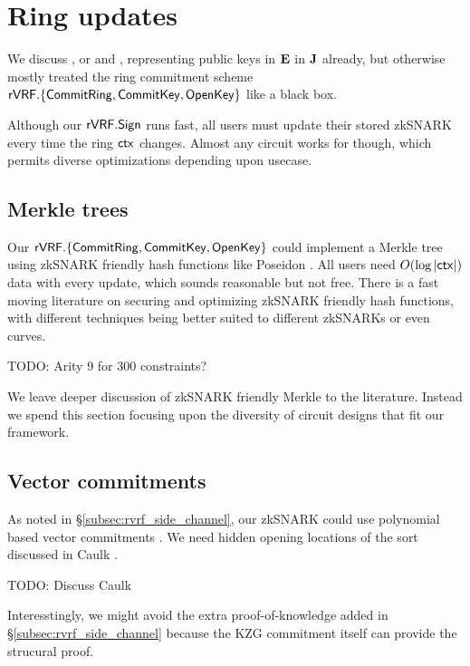 \section{Ring updates}
\label{sec:ring_updates}

We discuss \pifast, or \pisk and \pipk, representing public keys
 in ${\mathbf{E}}$ in ${\mathbf{J}}$ already,
but otherwise mostly treated the ring commitment scheme
${\mathsf{rVRF}}.\{ {\mathsf{CommitRing}}, {\mathsf{CommitKey}}, {\mathsf{OpenKey}} \}$ like a black box.

Although our ${\mathsf{rVRF}}.{\mathsf{Sign}}$ runs fast, all users must update their
stored zkSNARK \pipk every time the ring $\mathsf{ctx}$ changes.
Almost any circuit works for \pipk though,
 which permits diverse optimizations depending upon usecase.


\subsection{Merkle trees} %

Our ${\mathsf{rVRF}}.\{ {\mathsf{CommitRing}}, {\mathsf{CommitKey}}, {\mathsf{OpenKey}} \}$ could implement a
Merkle tree using zkSNARK friendly hash functions like Poseidon \cite{poseidon}.
%
All users need $O(\log |\mathsf{ctx}|)$ data with every update, which sounds
reasonable but not free.  There is a fast moving literature on securing
and optimizing zkSNARK friendly hash functions, with different techniques
being better suited to different zkSNARKs or even curves.

TODO: Arity 9 for 300 constraints?   %

We leave deeper discussion of zkSNARK friendly Merkle to the literature.
Instead we spend this section focusing upon the diversity of circuit
designs that fit our framework.


\subsection{Vector commitments}

As noted in \S\ref{subsec:rvrf_side_channel}, our zkSNARK \pipk could use
polynomial based vector commitments \cite{KZG}. %
We need hidden opening locations of the sort discussed in Caulk \cite{Caulk}.

TODO: Discuss Caulk

Interesstingly, we might avoid the extra proof-of-knowledge added
in \S\ref{subsec:rvrf_side_channel} because the KZG commitment itself
can provide the strucural proof.

